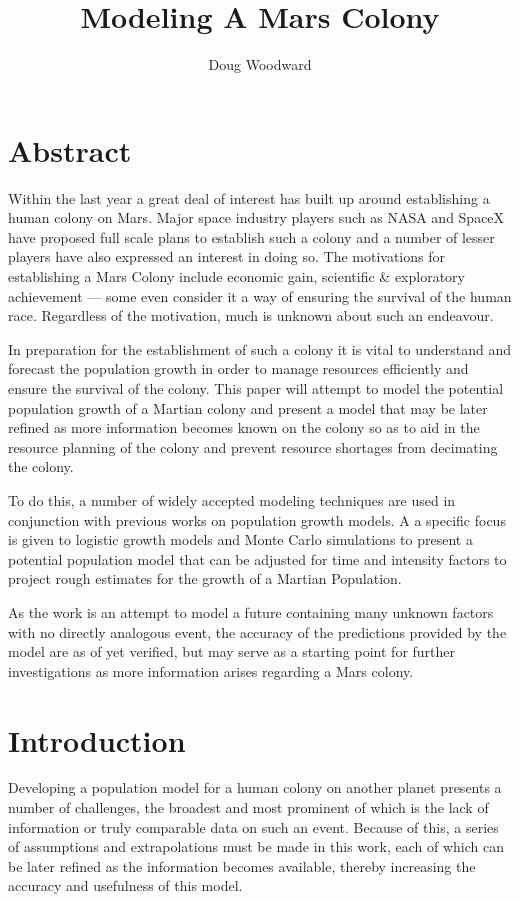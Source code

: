 \documentclass[12pt]{article}
\title{\textbf{Modeling A Mars Colony}}
\author{Doug Woodward\\}
\date{}
\begin{document}
\maketitle


\section{Abstract}


Within the last year a  great deal of interest has built up around establishing a human colony on Mars. Major space industry players such as NASA\cite{nasa} and SpaceX\cite{spacex} have proposed full scale plans to establish such a colony and a number of lesser players have also expressed an interest in doing so. The motivations for establishing a Mars Colony include economic gain, scientific \& exploratory achievement\cite{nasa} --- some even consider it a way of ensuring the survival of the human race\cite{spacex}. Regardless of the motivation, much is unknown about such an endeavour. 


In preparation for the establishment of such a colony it is vital to understand and forecast the population growth in order to manage resources efficiently and ensure the survival of the colony. This paper will attempt to model the potential population growth of a Martian colony and present a model that may be later refined as more information becomes known on the colony so as to aid in the resource planning of the colony and prevent resource shortages from decimating the colony. 


To do this, a number of widely accepted modeling techniques are used in conjunction with previous works on population growth models. A a specific focus is given to logistic growth models and Monte Carlo simulations to present a potential population model that can be adjusted for time and intensity factors to project rough estimates for the growth of a Martian Population.


As the work is an attempt to model a future containing many unknown factors with no directly analogous event, the accuracy of the predictions provided by the model are as of yet verified, but may serve as a starting point for further investigations as more information arises regarding a Mars colony.
\\




\section{Introduction}
Developing a population model for a human colony on another planet presents a number of challenges, the broadest and most prominent of which is the lack of information or truly comparable data on such an event. Because of this, a series of assumptions and extrapolations must be made in this work, each of which can be later refined as the information becomes available, thereby increasing the accuracy and usefulness of this model. 
\end{document}
